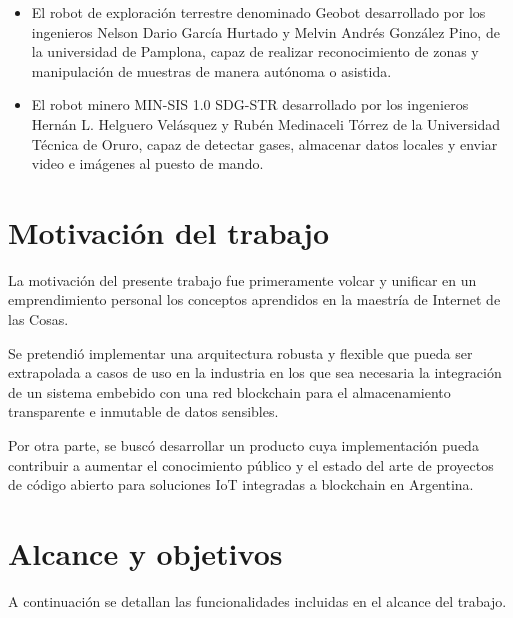 \begin{itemize}
	\item El robot de exploración terrestre denominado Geobot \cite{geobot} desarrollado por los ingenieros Nelson Dario García Hurtado y Melvin Andrés González Pino, de la universidad de Pamplona, capaz de realizar reconocimiento de zonas y manipulación de muestras de manera autónoma o asistida.

	\item El robot minero MIN-SIS 1.0 SDG-STR \cite{min-sis} desarrollado por los ingenieros Hernán L. Helguero Velásquez y Rubén Medinaceli Tórrez de la Universidad Técnica de Oruro, capaz de detectar gases, almacenar datos locales y enviar video e imágenes al puesto de mando.


\end{itemize}



\section{Motivación del trabajo}


La motivación del presente trabajo fue primeramente volcar y unificar en un emprendimiento personal los conceptos aprendidos en la maestría de Internet de las Cosas. 

Se pretendió implementar una arquitectura robusta y flexible que pueda ser extrapolada a casos de uso en la industria en los que sea necesaria la integración de un sistema embebido con una red blockchain para el almacenamiento transparente e inmutable de datos sensibles.  

Por otra parte, se buscó desarrollar un producto cuya implementación pueda contribuir a aumentar el conocimiento público y el estado del arte de proyectos de código abierto para soluciones IoT integradas a blockchain en Argentina.


\section{Alcance y objetivos}

A continuación se detallan las funcionalidades incluidas en el alcance del trabajo.


